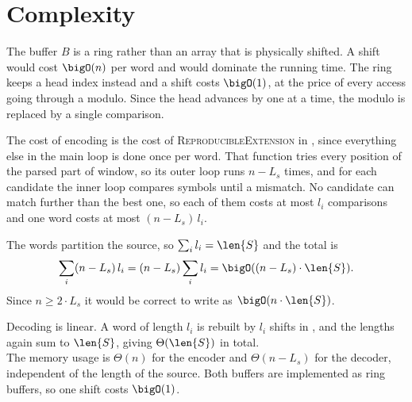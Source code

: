 \section{Complexity}
\label{sec:lz77-complexity}

The buffer \(B\) is a ring rather than an array that is physically shifted. A shift would cost \(\bigO(n)\) per word and would dominate the running time. The ring keeps a head index instead and a shift costs \(\bigO(1)\), at the price of every access going through a modulo. Since the head advances by one at a time, the modulo is replaced by a single comparison.

The cost of encoding is the cost of \textsc{ReproducibleExtension} in , since everything else in the main loop is done once per word. That function tries every position of the parsed part of window, so its outer loop runs \(n - L_s\) times, and for each candidate the inner loop compares symbols until a mismatch. No candidate can match further than the best one, so each of them costs at most \(l_i\) comparisons and one word costs at most \((n - L_s)\,l_i\).

The words partition the source, so \(\sum_i l_i = \len{S}\) and the total is
\[
    \sum_i (n - L_s)\,l_i = (n - L_s) \sum_i l_i = \bigO((n - L_s) \cdot \len{S}).
\]
Since \(n \geq 2 \cdot L_s \) it would be correct to write as \(\bigO(n \cdot \len{S})\).

Decoding is linear. A word of length \(l_i\) is rebuilt by \(l_i\) shifts in , and the lengths again sum to \(\len{S}\), giving \(\Theta(\len{S})\) in total.
\\

The memory usage is \(\Theta(n)\) for the encoder and \(\Theta(n - L_s)\) for the decoder, independent of the length of the source. Both buffers are implemented as ring buffers, so one shift costs \(\bigO(1)\).